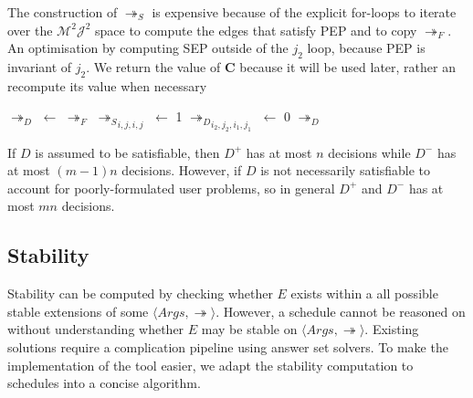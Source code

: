 The construction of $\twoheadrightarrow_S$ is expensive because of the explicit for-loops to iterate over the $\mathcal{M}^2\mathcal{J}^2$ space to compute the edges that satisfy PEP and to copy $\twoheadrightarrow_F$. An optimisation by computing SEP outside of the $j_2$ loop, because PEP is invariant of $j_2$. We return the value of $\mathbf{C}$ because it will be used later, rather an recompute its value when necessary

\begin{algorithm}[H]
	\caption{}
	\begin{algorithmic}[1]
			\State $\twoheadrightarrow_D$ $\gets$ $\twoheadrightarrow_F$
				\State ${\twoheadrightarrow_S}_{i,j,i,j}$ $\gets$ 1
			\EndFor
						\State ${\twoheadrightarrow_D}_{i_2,j_2,i_1,j_1}$ $\gets$ 0				
					\EndFor
				\EndFor
			\EndFor
			\State \Return $\twoheadrightarrow_D$
		\EndFunction
	\end{algorithmic}
\end{algorithm}

If $D$ is assumed to be satisfiable, then $D^+$ has at most $n$ decisions while $D^-$ has at most $(m-1)n$ decisions. However, if $D$ is not necessarily satisfiable to account for poorly-formulated user problems, so in general $D^+$ and $D^-$ has at most $mn$ decisions.

\subsection{Stability}

Stability can be computed by checking whether $E$ exists within a all possible stable extensions of some $\langle Args, \twoheadrightarrow\rangle$. However, a schedule cannot be reasoned on without understanding whether $E$ may be stable on $\langle Args, \twoheadrightarrow\rangle$. Existing solutions require a complication pipeline using answer set solvers. To make the implementation of the tool easier, we adapt the stability computation to schedules into a concise algorithm.

